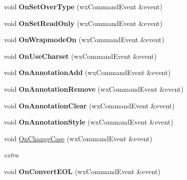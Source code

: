 \begin{DoxyCompactItemize}
\item 
\hypertarget{class_edit_a7ba02b7307434853f23c787f858dd10e}{void {\bfseries On\+Set\+Over\+Type} (wx\+Command\+Event \&event)}\label{class_edit_a7ba02b7307434853f23c787f858dd10e}

\item 
\hypertarget{class_edit_a28f90e2baa3b28cb5cb72578f41c1b6a}{void {\bfseries On\+Set\+Read\+Only} (wx\+Command\+Event \&event)}\label{class_edit_a28f90e2baa3b28cb5cb72578f41c1b6a}

\item 
\hypertarget{class_edit_aa10e8f9dc7a7dcec051832e2bce186fa}{void {\bfseries On\+Wrapmode\+On} (wx\+Command\+Event \&event)}\label{class_edit_aa10e8f9dc7a7dcec051832e2bce186fa}

\item 
\hypertarget{class_edit_a94585b38355ccbadc7550e17f7ccb320}{void {\bfseries On\+Use\+Charset} (wx\+Command\+Event \&event)}\label{class_edit_a94585b38355ccbadc7550e17f7ccb320}

\item 
\hypertarget{class_edit_aba8807e4d99524b9ebec4dff2501720c}{void {\bfseries On\+Annotation\+Add} (wx\+Command\+Event \&event)}\label{class_edit_aba8807e4d99524b9ebec4dff2501720c}

\item 
\hypertarget{class_edit_a990bc053deb4490d21aee2c978d0c5b1}{void {\bfseries On\+Annotation\+Remove} (wx\+Command\+Event \&event)}\label{class_edit_a990bc053deb4490d21aee2c978d0c5b1}

\item 
\hypertarget{class_edit_ac4b693934cbc7e0478bbef89e28a1a2f}{void {\bfseries On\+Annotation\+Clear} (wx\+Command\+Event \&event)}\label{class_edit_ac4b693934cbc7e0478bbef89e28a1a2f}

\item 
\hypertarget{class_edit_a81e4aba09a6269ed023d59d6f441c079}{void {\bfseries On\+Annotation\+Style} (wx\+Command\+Event \&event)}\label{class_edit_a81e4aba09a6269ed023d59d6f441c079}

\item 
\hypertarget{class_edit_a35f2c182c8161d70df526d7ac672598d}{void \hyperlink{class_edit_a35f2c182c8161d70df526d7ac672598d}{On\+Change\+Case} (wx\+Command\+Event \&event)}\label{class_edit_a35f2c182c8161d70df526d7ac672598d}

\begin{DoxyCompactList}\small\item\em extra \end{DoxyCompactList}\item 
\hypertarget{class_edit_aa9765073b671289574f6e69b377e3b5f}{void {\bfseries On\+Convert\+E\+O\+L} (wx\+Command\+Event \&event)}\label{class_edit_aa9765073b671289574f6e69b377e3b5f}


\end{DoxyCompactItemize}
